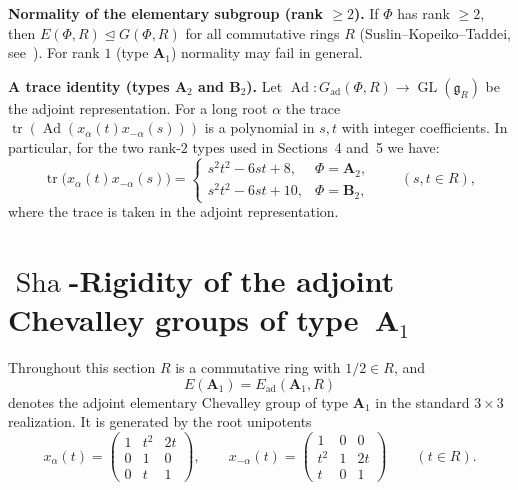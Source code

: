 \documentclass[]{jgcc}
\DeclareMathOperator{\tr}{tr}
\DeclareMathOperator{\Ad}{Ad}
\DeclareMathOperator{\GL}{GL}
\numberwithin{equation}{section}
\newcommand{\Sha}{\operatorname{Sha}}
\begin{document}
\medskip
\noindent\textbf{Normality of the elementary subgroup (rank $\ge 2$).}
If $\Phi$ has rank $\ge 2$, then $E(\Phi,R)\trianglelefteq G(\Phi,R)$ for all commutative rings $R$
(Suslin--Kopeiko--Taddei, see~\cite{v41}). For rank $1$ (type $\mathbf A_1$) normality may fail in general.

\medskip
\noindent\textbf{A trace identity (types $\mathbf A_2$ and $\mathbf B_2$).}
Let $\Ad\colon G_{\mathrm{ad}}(\Phi,R)\to \GL(\mathfrak g_R)$ be the adjoint representation.
For a long root $\alpha$ the trace $\tr(\Ad(x_\alpha(t)x_{-\alpha}(s)))$ is a polynomial in $s,t$ with integer
coefficients. In particular, for the two rank-$2$ types used in Sections~4 and~5 we have:
\begin{equation}\label{eq:traceA2B2}
\tr\!\bigl(x_\alpha(t)x_{-\alpha}(s)\bigr)=
\begin{cases}
s^2t^2-6st+8, & \Phi=\mathbf A_2,\\
s^2t^2-6st+10,& \Phi=\mathbf B_2,
\end{cases}
\qquad (s,t\in R),
\end{equation}
where the trace is taken in the adjoint representation.

\section{\texorpdfstring{$\Sha$-Rigidity of the adjoint Chevalley groups of type~$\mathbf A_1$}{Sha-Rigidity of the adjoint Chevalley groups of type A1}}\label{sec:A1}

Throughout this section $R$ is a commutative ring with $1/2\in R$, and
\[
E(\mathbf A_1)=E_{\mathrm{ad}}(\mathbf A_1,R)
\]
denotes the adjoint elementary Chevalley group of type $\mathbf A_1$ in the standard $3\times3$ realization.
It is generated by the root unipotents
\[
x_\alpha(t)=\begin{pmatrix}
1& t^2 & 2t\\
0& 1& 0\\
0& t& 1
\end{pmatrix},\qquad
x_{-\alpha}(t)=\begin{pmatrix}
1& 0& 0\\
t^2& 1& 2t\\
t& 0& 1
\end{pmatrix}\qquad (t\in R).
\]
\end{document}
